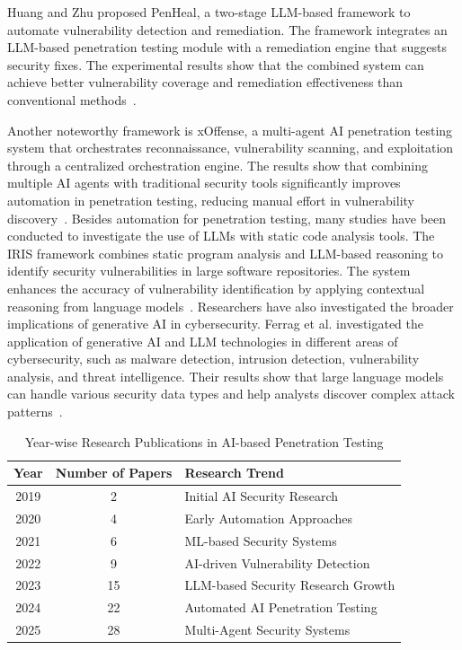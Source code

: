 \documentclass[runningheads]{llncs}
\begin{document}
Huang and Zhu proposed PenHeal, a two-stage LLM-based framework to automate vulnerability detection and remediation. The framework integrates an LLM-based penetration testing module with a remediation engine that suggests security fixes. The experimental results show that the combined system can achieve better vulnerability coverage and remediation effectiveness than conventional methods~\cite{huang2024penheal}.

Another noteworthy framework is xOffense, a multi-agent AI penetration testing system that orchestrates reconnaissance, vulnerability scanning, and exploitation through a centralized orchestration engine. The results show that combining multiple AI agents with traditional security tools significantly improves automation in penetration testing, reducing manual effort in vulnerability discovery~\cite{chen2025xoffense}. Besides automation for penetration testing, many studies have been conducted to investigate the use of LLMs with static code analysis tools. The IRIS framework combines static program analysis and LLM-based reasoning to identify security vulnerabilities in large software repositories. The system enhances the accuracy of vulnerability identification by applying contextual reasoning from language models~\cite{zhang2024iris}. Researchers have also investigated the broader implications of generative AI in cybersecurity. Ferrag et al. investigated the application of generative AI and LLM technologies in different areas of cybersecurity, such as malware detection, intrusion detection, vulnerability analysis, and threat intelligence. Their results show that large language models can handle various security data types and help analysts discover complex attack patterns~\cite{ferrag2024generative}.

\begin{table}[t!]
\centering
\caption{Year-wise Research Publications in AI-based Penetration Testing}
\label{tab:years}
\begin{tabular}{c c l}
\toprule
\textbf{Year} & \textbf{Number of Papers} & \textbf{Research Trend} \\
\midrule
2019 & 2 & Initial AI Security Research \\
2020 & 4 & Early Automation Approaches \\
2021 & 6 & ML-based Security Systems \\
2022 & 9 & AI-driven Vulnerability Detection \\
2023 & 15 & LLM-based Security Research Growth \\
2024 & 22 & Automated AI Penetration Testing \\
2025 & 28 & Multi-Agent Security Systems \\
\bottomrule
\end{tabular}
\end{table}
\end{document}
